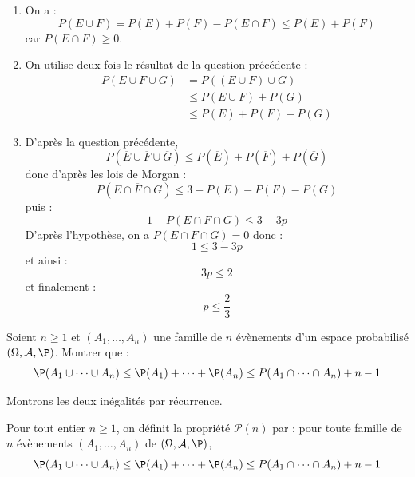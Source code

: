 \documentclass[a4paper,10pt]{report}
\begin{document}
\corr 
\begin{enumerate}
\item On a :
$$ P(E \cup F) = P(E) + P(F) - P(E \cap F) \leq P(E)+P(F)$$
car $P(E \cap F) \geq 0$.
\item On utilise deux fois le résultat de la question précédente :
\begin{align*}
P(E \cup F \cup G) & = P((E \cup F) \cup G) \\
& \leq P(E \cup F) + P(G) \\
& \leq P(E) + P(F) + P(G)
\end{align*}
\item D'après la question précédente,
$$ P(\overline{E} \cup \overline{F} \cup \overline{G})  \leq  P(\overline{E}) + P(\overline{F}) + P(\overline{G})$$
donc d'après les lois de Morgan :
$$ P(\overline{E \cap F \cap G}) \leq 3-P(E)-P(F)-P(G)$$
puis :
$$ 1-P(E \cap F \cap G) \leq 3-3p$$
D'après l'hypothèse, on a $P(E \cap F \cap G)=0$ donc :
$$ 1 \leq 3-3p$$
et ainsi :
$$3p \leq 2$$
et finalement :
$$ p \leq \dfrac{2}{3}$$
\end{enumerate}


\begin{Exercice}{} Soient $n \geq 1$ et $(A_1, \ldots, A_n)$ une famille de $n$ évènements d'un espace probabilisé $(\Omega, \mathcal{A}, \P)$. Montrer que :
$$ \P(A_1 \cup \cdots \cup A_n) \leq \P(A_1) + \cdots + \P(A_n) \leq P(A_1 \cap \cdots \cap A_n) + n-1$$
\end{Exercice}

\corr Montrons les deux inégalités par récurrence.

\medskip

\noindent Pour tout entier $n \geq 1$, on définit la propriété $\mathcal{P}(n)$ par : pour toute famille de $n$ évènements $(A_1, \ldots, A_n)$ de $(\Omega, \mathcal{A}, \P)$, 
$$ \P(A_1 \cup \cdots \cup A_n) \leq \P(A_1) + \cdots + \P(A_n) \leq P(A_1 \cap \cdots \cap A_n) + n-1$$
\end{document}
